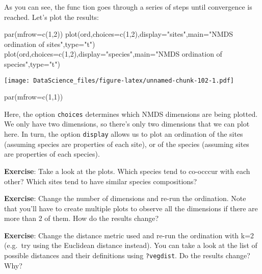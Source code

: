 \documentclass[
]{book}
\newenvironment{Shaded}{\begin{snugshade}}{\end{snugshade}}
\newcommand{\AttributeTok}[1]{\textcolor[rgb]{0.77,0.63,0.00}{#1}}
\newcommand{\DecValTok}[1]{\textcolor[rgb]{0.00,0.00,0.81}{#1}}
\newcommand{\FunctionTok}[1]{\textcolor[rgb]{0.00,0.00,0.00}{#1}}
\newcommand{\NormalTok}[1]{#1}
\newcommand{\StringTok}[1]{\textcolor[rgb]{0.31,0.60,0.02}{#1}}
\begin{document}
As you can see, the func tion goes through a series of steps until convergence is reached. Let's plot the results:

\begin{Shaded}
\begin{Highlighting}[]
\FunctionTok{par}\NormalTok{(}\AttributeTok{mfrow=}\FunctionTok{c}\NormalTok{(}\DecValTok{1}\NormalTok{,}\DecValTok{2}\NormalTok{))}
\FunctionTok{plot}\NormalTok{(ord,}\AttributeTok{choices=}\FunctionTok{c}\NormalTok{(}\DecValTok{1}\NormalTok{,}\DecValTok{2}\NormalTok{),}\AttributeTok{display=}\StringTok{"sites"}\NormalTok{,}\AttributeTok{main=}\StringTok{"NMDS ordination of sites"}\NormalTok{,}\AttributeTok{type=}\StringTok{"t"}\NormalTok{)}
\FunctionTok{plot}\NormalTok{(ord,}\AttributeTok{choices=}\FunctionTok{c}\NormalTok{(}\DecValTok{1}\NormalTok{,}\DecValTok{2}\NormalTok{),}\AttributeTok{display=}\StringTok{"species"}\NormalTok{,}\AttributeTok{main=}\StringTok{"NMDS ordination of species"}\NormalTok{,}\AttributeTok{type=}\StringTok{"t"}\NormalTok{)}
\end{Highlighting}
\end{Shaded}

\texttt{[image: DataScience\_files/figure-latex/unnamed-chunk-102-1.pdf]}

\begin{Shaded}
\begin{Highlighting}[]
\FunctionTok{par}\NormalTok{(}\AttributeTok{mfrow=}\FunctionTok{c}\NormalTok{(}\DecValTok{1}\NormalTok{,}\DecValTok{1}\NormalTok{))}
\end{Highlighting}
\end{Shaded}

Here, the option \texttt{choices} determines which NMDS dimensions are being plotted. We only have two dimensions, so there's only two dimensions that we can plot here. In turn, the option \texttt{display} allows us to plot an ordination of the sites (assuming species are properties of each site), or of the species (assuming sites are properties of each species).

\textbf{Exercise}: Take a look at the plots. Which species tend to co-occcur with each other? Which sites tend to have similar species compositions?

\textbf{Exercise}: Change the number of dimensions and re-run the ordination. Note that you'll have to create multiple plots to observe all the dimensions if there are more than 2 of them. How do the results change?

\textbf{Exercise}: Change the distance metric used and re-run the ordination with k=2 (e.g.~try using the Euclidean distance instead). You can take a look at the list of possible distances and their definitions using \texttt{?vegdist}. Do the results change? Why?
\end{document}
